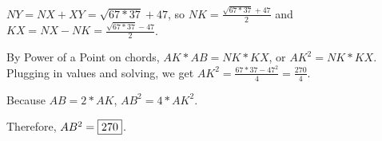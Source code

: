 \begin{enumerate}
 $NY=NX+XY=\sqrt{67*37}+47$, so $NK=\frac{\sqrt{67*37}+47}{2}$ and $KX=NX-NK=\frac{\sqrt{67*37}-47}{2}$.

 By Power of a Point on chords, $AK*AB=NK*KX$, or $AK^2=NK*KX$. Plugging in values and solving, we get $AK^2=\frac{67*37-47^2}{4}=\frac{270}{4}$.

 Because $AB=2*AK$, $AB^2=4*AK^2$.

 Therefore, $AB^2=\framebox{270}$.

 


\end{enumerate}